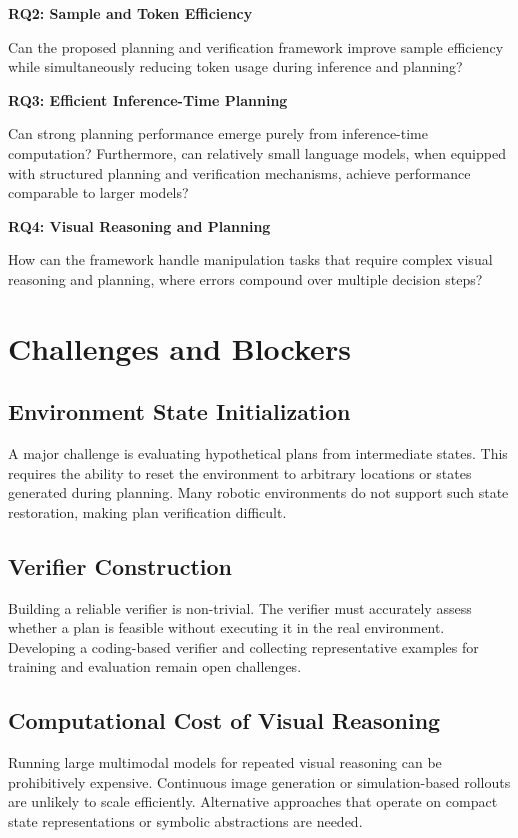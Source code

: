 \documentclass{article} %
\begin{document}
\textbf{RQ2: Sample and Token Efficiency}

Can the proposed planning and verification framework improve sample efficiency while simultaneously reducing token usage during inference and planning?

\textbf{RQ3: Efficient Inference-Time Planning}

Can strong planning performance emerge purely from inference-time computation? Furthermore, can relatively small language models, when equipped with structured planning and verification mechanisms, achieve performance comparable to larger models?

\textbf{RQ4: Visual Reasoning and Planning}

How can the framework handle manipulation tasks that require complex visual reasoning and planning, where errors compound over multiple decision steps?

\section{Challenges and Blockers}

\subsection{Environment State Initialization}

A major challenge is evaluating hypothetical plans from intermediate states. This requires the ability to reset the environment to arbitrary locations or states generated during planning. Many robotic environments do not support such state restoration, making plan verification difficult.

\subsection{Verifier Construction}

Building a reliable verifier is non-trivial. The verifier must accurately assess whether a plan is feasible without executing it in the real environment. Developing a coding-based verifier and collecting representative examples for training and evaluation remain open challenges.

\subsection{Computational Cost of Visual Reasoning}

Running large multimodal models for repeated visual reasoning can be prohibitively expensive. Continuous image generation or simulation-based rollouts are unlikely to scale efficiently. Alternative approaches that operate on compact state representations or symbolic abstractions are needed.
\end{document}
